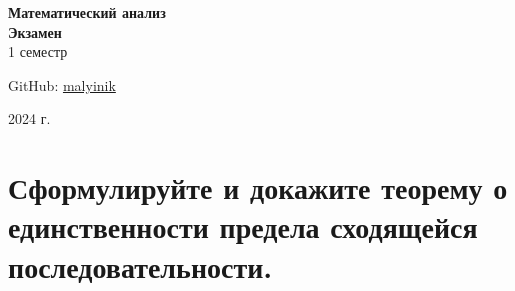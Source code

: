 
\usepackage{tocloft}
\setlength{\cftsubsecnumwidth}{2.8em}


\begin{titlepage}
  \vspace*{0pt}
  \vfill
  \centering
  \Huge\textbf{Математический анализ} \\[7pt]
  \Large\textbf{Экзамен} \\
  \large 1 семестр \\ 
  \vfill
  \begin{flushright}
      \normalsize GitHub: \href{https://github.com/malyinik}{malyinik} \\
  \end{flushright}
  \normalsize 2024 г.
\end{titlepage}
\newpage

\tableofcontents
\newpage

\section{Сформулируйте и докажите теорему о единственности предела сходящейся последовательности.}

